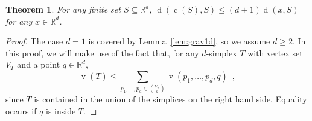 \documentclass[preprint, 12pt]{elsarticle}
\newtheorem{thm}{Theorem}
\DeclareMathOperator{\od}{d}
\DeclareMathOperator{\vol}{v}
\DeclareMathOperator{\cog}{c}
\begin{document}
\begin{thm}
\label{thm:gravdd}
For any finite set $S\subseteq\mathbb{R}^d$,
$\od(\cog(S),S) \le (d+1)\od(x,S)$ for any $x\in\mathbb{R}^d$.
\end{thm}

\begin{proof}
The case $d = 1$ is covered by Lemma~\ref{lem:grav1d}, so we assume $d \ge 2$. In this proof, we will make use of the fact that, for any $d$-simplex $T$
with vertex set $V_T$ and a point
$q\in\mathbb{R}^d$,
\begin{equation}
  \vol(T) \le \sum_{p_1,\ldots,p_d\in\binom{V_T}{d}} \vol(p_1,\ldots,p_d,q)\enspace , 
   \label{eq:cover}
\end{equation}
since $T$ is contained in the union of the simplices on the right hand side. Equality occurs if $q$ is inside $T$.


\end{proof}
\end{document}
